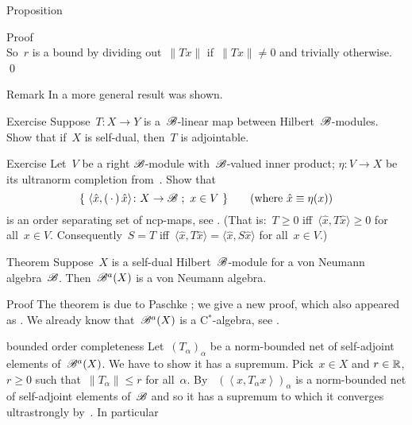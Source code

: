 \documentclass[b]{subfiles}
\begin{document}
\begin{parsec}
\begin{point}{Proposition}
\begin{point}{Proof}
\begin{equation*}
\end{equation*}
So~$r$ is a bound
    by dividing out~$\| T x \|$
    if~$\| Tx \| \neq 0$
    and trivially otherwise.  \qed
\end{point}
\begin{point}{Remark}%
In  a more general result was shown.
\end{point}
\end{point}
\begin{point}{Exercise}%
Suppose~$T\colon X \to Y$ is a~$\mathscr{B}$-linear map between
    Hilbert~$\mathscr{B}$-modules.
Show that if~$X$ is self-dual,
    then~$T$ is adjointable.
\end{point}
\begin{point}{Exercise}%
Let~$V$ be a right $\mathscr{B}$-module with~$\mathscr{B}$-valued inner product;
    $\eta\colon V \to X$ be its ultranorm completion
    from~.
Show that
\begin{equation*}
    \{\ \langle \hat{x}, (\,\cdot\,)\, \hat{x}\rangle \colon X \to \mathscr{B} \ ;\ x \in V\  \} \qquad \text{(where $\hat{x} \equiv \eta(x)$)}
\end{equation*}
is an order separating set of ncp-maps, see .
    (That is:~$T \geq 0$ iff~$\langle \hat{x}, T \hat{x}\rangle \geq 0$
    for all~$x \in V$.
    Consequently~$S = T$ iff~$\langle \hat{x}, T \hat{x} \rangle 
    = \langle \hat{x}, S \hat{x} \rangle$ for all~$x \in V$.)
\end{point}
\begin{point}{Theorem}%
Suppose~$X$ is a self-dual Hilbert~$\mathscr{B}$-module
    for a von Neumann algebra~$\mathscr{B}$.
Then~$\mathscr{B}^a(X)$ is a von Neumann algebra.
\begin{point}{Proof}%
The theorem is due to Paschke \cite[Prop.~3.10]{paschke};
    we give a new proof, which also appeared as .
We already know that~$\mathscr{B}^a(X)$ is a C$^*$-algebra, see .
\begin{point}{bounded order completeness}%
Let~$(T_\alpha)_\alpha$ be a norm-bounded net of self-adjoint elements
    of~$\mathscr{B}^a(X)$.  We have to show it has a supremum.
Pick~$x\in X$ and  $r\in \mathbb{R}$, $r\geq0 $
such that~$\|T_\alpha\| \leq r$ for all~$\alpha$.
By ~$(\left<x,T_\alpha x\right>)_\alpha$
    is a norm-bounded net of self-adjoint elements of~$\mathscr{B}$
    and so it has a supremum to which
    it converges ultrastrongly by~.
In particular
\begin{equation*}

\end{equation*}
\end{point}
\end{point}
\end{point}
\end{parsec}
\end{document}
